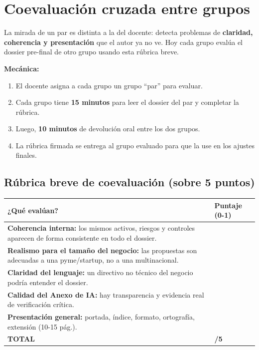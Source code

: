 \documentclass[12pt,a4paper]{article}
\renewcommand{\arraystretch}{1.25}
\begin{document}
\newpage
\section{Coevaluaci\'on cruzada entre grupos}

La mirada de un par es distinta a la del docente: detecta problemas de \textbf{claridad, coherencia y presentaci\'on} que el autor ya no ve. Hoy cada grupo eval\'ua el dossier pre-final de otro grupo usando esta r\'ubrica breve.

\begin{cajaFeedback}
\textbf{Mec\'anica:}
\begin{enumerate}[leftmargin=2em]
    \item El docente asigna a cada grupo un grupo ``par'' para evaluar.
    \item Cada grupo tiene \textbf{15 minutos} para leer el dossier del par y completar la r\'ubrica.
    \item Luego, \textbf{10 minutos} de devoluci\'on oral entre los dos grupos.
    \item La r\'ubrica firmada se entrega al grupo evaluado para que la use en los ajustes finales.
\end{enumerate}
\end{cajaFeedback}

\subsection{R\'ubrica breve de coevaluaci\'on (sobre 5 puntos)}

\renewcommand{\arraystretch}{1.5}
\begin{tabularx}{\textwidth}{|X|>{\centering\arraybackslash}p{1.8cm}|}
\hline
\rowcolor{verdeFeedback!20}
\textbf{¿Qu\'e eval\'uan?} & \textbf{Puntaje (0-1)} \\
\hline
\textbf{Coherencia interna:} los mismos activos, riesgos y controles aparecen de forma consistente en todo el dossier. & \hrulefill \\
\hline
\textbf{Realismo para el tama\~no del negocio:} las propuestas son adecuadas a una pyme/startup, no a una multinacional. & \hrulefill \\
\hline
\textbf{Claridad del lenguaje:} un directivo no t\'ecnico del negocio podr\'ia entender el dossier. & \hrulefill \\
\hline
\textbf{Calidad del Anexo de IA:} hay transparencia y evidencia real de verificaci\'on cr\'itica. & \hrulefill \\
\hline
\textbf{Presentaci\'on general:} portada, \'indice, formato, ortograf\'ia, extensi\'on (10-15 p\'ag.). & \hrulefill \\
\hline
\rowcolor{grisClaro}
\textbf{TOTAL} & \textbf{\hrulefill /5} \\
\hline
\end{tabularx}
\end{document}
